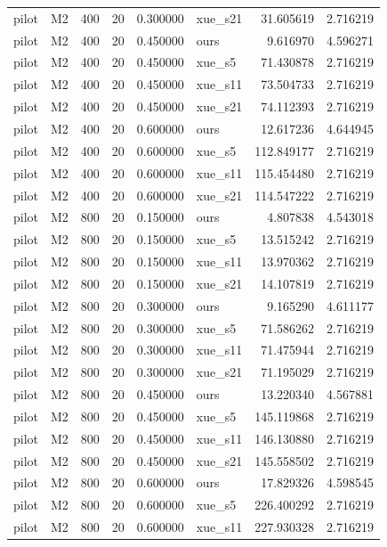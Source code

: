 \begin{longtable}{llrrrlrr}
pilot & M2 & 400 & 20 & 0.300000 & xue\_s21 & 31.605619 & 2.716219 \\
pilot & M2 & 400 & 20 & 0.450000 & ours & 9.616970 & 4.596271 \\
pilot & M2 & 400 & 20 & 0.450000 & xue\_s5 & 71.430878 & 2.716219 \\
pilot & M2 & 400 & 20 & 0.450000 & xue\_s11 & 73.504733 & 2.716219 \\
pilot & M2 & 400 & 20 & 0.450000 & xue\_s21 & 74.112393 & 2.716219 \\
pilot & M2 & 400 & 20 & 0.600000 & ours & 12.617236 & 4.644945 \\
pilot & M2 & 400 & 20 & 0.600000 & xue\_s5 & 112.849177 & 2.716219 \\
pilot & M2 & 400 & 20 & 0.600000 & xue\_s11 & 115.454480 & 2.716219 \\
pilot & M2 & 400 & 20 & 0.600000 & xue\_s21 & 114.547222 & 2.716219 \\
pilot & M2 & 800 & 20 & 0.150000 & ours & 4.807838 & 4.543018 \\
pilot & M2 & 800 & 20 & 0.150000 & xue\_s5 & 13.515242 & 2.716219 \\
pilot & M2 & 800 & 20 & 0.150000 & xue\_s11 & 13.970362 & 2.716219 \\
pilot & M2 & 800 & 20 & 0.150000 & xue\_s21 & 14.107819 & 2.716219 \\
pilot & M2 & 800 & 20 & 0.300000 & ours & 9.165290 & 4.611177 \\
pilot & M2 & 800 & 20 & 0.300000 & xue\_s5 & 71.586262 & 2.716219 \\
pilot & M2 & 800 & 20 & 0.300000 & xue\_s11 & 71.475944 & 2.716219 \\
pilot & M2 & 800 & 20 & 0.300000 & xue\_s21 & 71.195029 & 2.716219 \\
pilot & M2 & 800 & 20 & 0.450000 & ours & 13.220340 & 4.567881 \\
pilot & M2 & 800 & 20 & 0.450000 & xue\_s5 & 145.119868 & 2.716219 \\
pilot & M2 & 800 & 20 & 0.450000 & xue\_s11 & 146.130880 & 2.716219 \\
pilot & M2 & 800 & 20 & 0.450000 & xue\_s21 & 145.558502 & 2.716219 \\
pilot & M2 & 800 & 20 & 0.600000 & ours & 17.829326 & 4.598545 \\
pilot & M2 & 800 & 20 & 0.600000 & xue\_s5 & 226.400292 & 2.716219 \\
pilot & M2 & 800 & 20 & 0.600000 & xue\_s11 & 227.930328 & 2.716219 \\

\end{longtable}
